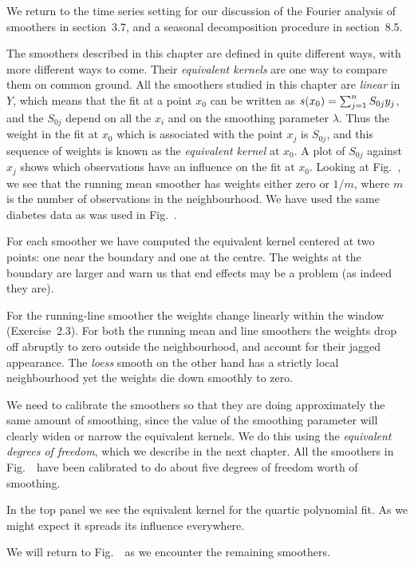We return to the time series setting for our discussion of   the Fourier analysis
of smoothers in section~3.7, and a seasonal decomposition procedure in
section~8.5.

\Sectionskip
{}
The smoothers described in this chapter are defined in quite different ways, with
more different ways to come. 
Their {\sl equivalent kernels} are one way to compare
them on common ground. 
All the smoothers studied in this chapter  are {\sl linear} in $Y$, which means that the fit at a point $x_0$ can be written as ${s}(x_0)=\sum_{j=1}^n S_{0j}y_j$, and the $S_{0j}$ depend on all the $x_i$ and on the smoothing parameter $\lambda$.
Thus the weight in the fit at $x_0$ which is associated with the point $x_j$ is $S_{0j}$, and this sequence of weights is known as the {\em equivalent kernel} at $x_0$. 
A plot of $S_{0j}$ against $x_j$  shows which observations have an influence on the fit at $x_0$. 
Looking at Fig.~\hatplot, we see that the running mean smoother has weights
either zero or $1/m$, where $m$ is the number of observations in the neighbourhood.
We have used the same diabetes data as was used in Fig.~\allsmooths.

For each smoother we have computed the equivalent kernel centered at two points: one near the boundary and one at the centre. 
The weights at the boundary are larger and warn us that end effects may be a problem (as indeed they are). 

For the  running-line smoother  the weights change linearly within the window (Exercise~2.3). 
For both the running mean and line smoothers the weights drop off
abruptly to zero outside the neighbourhood, and account for their jagged appearance.
The {\em loess} smooth on the other hand has a strictly local neighbourhood yet the weights die down smoothly to zero.

We need to calibrate the smoothers so that they are doing approximately the same amount of smoothing, since the value of the smoothing parameter will clearly widen or narrow the equivalent kernels. 
We do this using the {\sl equivalent degrees of freedom}, which we describe in the next chapter. 
All the smoothers in Fig.~\hatplot\ have been calibrated to do about five degrees of freedom worth of smoothing. 

In the top panel we see the equivalent kernel for the  quartic polynomial fit. 
As we might expect it spreads its influence everywhere. 

We will return to Fig.~\hatplot\ as we encounter the remaining smoothers.

